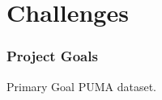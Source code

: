 \documentclass[../main.tex]{subfiles}
\begin{document}
\section{Challenges}
\begin{frame}[t]
    \frametitle{Project Goals}

    \begin{block}{Primary Goal}
        PUMA dataset.
    \end{block}
\end{frame}
\end{document}
